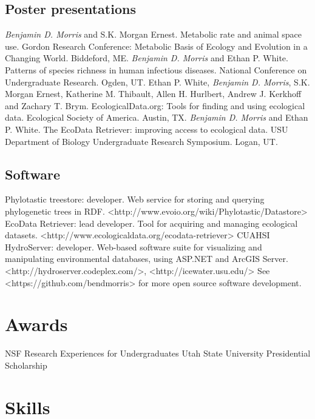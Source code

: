 \documentclass[11pt,letter]{moderncv}
\begin{document}
\subsection{Poster presentations}
 {
    \emph{Benjamin D. Morris} and S.K. Morgan Ernest. Metabolic rate and animal space use. Gordon Research Conference: Metabolic Basis of Ecology and Evolution in a Changing World. Biddeford, ME.
}
\cvline{} {
    \emph{Benjamin D. Morris} and Ethan P. White. Patterns of species richness in human infectious diseases. National Conference on Undergraduate Research. Ogden, UT.
}
 {
    Ethan P. White, \emph{Benjamin D. Morris}, S.K. Morgan Ernest, Katherine M. Thibault, Allen H. Hurlbert, Andrew J. Kerkhoff and Zachary T. Brym. EcologicalData.org: Tools for finding and using ecological data. Ecological Society of America. Austin, TX.
}
 {
    \emph{Benjamin D. Morris} and Ethan P. White. The EcoData Retriever: improving access to ecological data. USU Department of Biology Undergraduate Research Symposium. Logan, UT.
}


\subsection{Software}
 {
    Phylotastic treestore: developer. Web service for storing and querying phylogenetic trees in RDF.
    <http://www.evoio.org/wiki/Phylotastic/Datastore>
}
\cvline{} {
    EcoData Retriever: lead developer. Tool for acquiring and managing ecological datasets.
    <http://www.ecologicaldata.org/ecodata-retriever>
}
 {
    CUAHSI HydroServer: developer. Web-based software suite for visualizing and manipulating environmental databases, using ASP.NET and ArcGIS Server.
    <http://hydroserver.codeplex.com/>, <http://icewater.usu.edu/>
}
 {
    See <https://github.com/bendmorris> for more open source software development.
}


\section{Awards}
 {NSF Research Experiences for Undergraduates}
 {Utah State University Presidential Scholarship}


\section{Skills}
\end{document}
